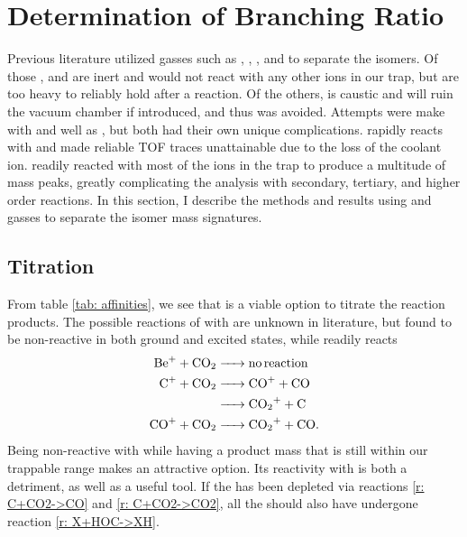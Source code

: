 \section{Determination of Branching Ratio}

Previous literature utilized gasses such as , , , and  to separate the isomers.\cite{Love1987} Of those , and  are inert and would not react with any other ions in our trap, but are too heavy to reliably hold after a reaction. Of the others,  is caustic and will ruin the vacuum chamber if introduced, and thus was avoided. Attempts were make with  and well as , but both had their own unique complications.  rapidly reacts with  and made reliable TOF traces unattainable due to the loss of the coolant ion.  readily reacted with most of the ions in the trap to produce a multitude of mass peaks, greatly complicating the analysis with secondary, tertiary, and higher order reactions. In this section, I describe the methods and results using  and  gasses to separate the isomer mass signatures.

\subsection{ Titration}

From table \ref{tab: affinities}, we see that  is a viable option to titrate the reaction products. The possible reactions of  with  are unknown in literature, but found to be non-reactive in both ground and excited states, while  readily reacts
\begin{align}
	\ce{Be+ + CO2 & -> no reaction} \nonumber \\
	\ce{C+ + CO2 & -> CO+ + CO} \label{r: C+CO2->CO} \\
	\ce{& -> CO2+ + C} \label{r: C+CO2->CO2} \\
	\ce{CO+ + CO2 & -> CO2+ + CO}. \label{r: CO+CO2->CO2}
\end{align}
Being non-reactive with  while having a product mass that is still within our trappable range makes  an attractive option. Its reactivity with  is both a detriment, as well as a useful tool. If the  has been depleted via reactions \ref{r: C+CO2->CO} and \ref{r: C+CO2->CO2}, all the  should also have undergone reaction \ref{r: X+HOC->XH}.

%

